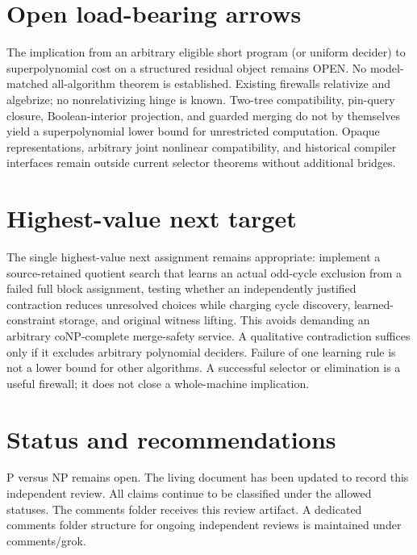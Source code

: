 \documentclass[11pt]{article}
\begin{document}
\section{Open load-bearing arrows}
The implication from an arbitrary eligible short program (or uniform decider) to superpolynomial cost on a structured residual object remains OPEN. No model-matched all-algorithm theorem is established. Existing firewalls relativize and algebrize; no nonrelativizing hinge is known. Two-tree compatibility, pin-query closure, Boolean-interior projection, and guarded merging do not by themselves yield a superpolynomial lower bound for unrestricted computation. Opaque representations, arbitrary joint nonlinear compatibility, and historical compiler interfaces remain outside current selector theorems without additional bridges.

\section{Highest-value next target}
The single highest-value next assignment remains appropriate: implement a source-retained quotient search that learns an actual odd-cycle exclusion from a failed full block assignment, testing whether an independently justified contraction reduces unresolved choices while charging cycle discovery, learned-constraint storage, and original witness lifting. This avoids demanding an arbitrary coNP-complete merge-safety service. A qualitative contradiction suffices only if it excludes arbitrary polynomial deciders. Failure of one learning rule is not a lower bound for other algorithms. A successful selector or elimination is a useful firewall; it does not close a whole-machine implication.

\section{Status and recommendations}
P versus NP remains open. The living document has been updated to record this independent review. All claims continue to be classified under the allowed statuses. The comments folder receives this review artifact. A dedicated comments folder structure for ongoing independent reviews is maintained under comments/grok.

\end{document}
